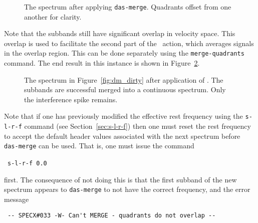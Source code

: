 \begin{figure}[ht]
\begin{minipage}[t]{\textwidth}
\begin{minipage}[b]{0.5\textwidth}
\leavevmode
\centering
\epsfxsize=3.0in
\end{minipage}
\hfill
\begin{minipage}[b]{0.45\textwidth}
\caption[After {\tt das-merge}]
{\small{The spectrum after applying {\tt das-merge}. Quadrants offset
from one another for clarity.
\vspace*{2cm}
}}
\label{fig:after-das-merge}
\end{minipage}
\end{minipage}
\end{figure}

Note that the subbands still have significant overlap in velocity
space. This overlap is used to facilitate the second part of the \dm\
action, which averages signals in the overlap region. This can be done
separately using the {\tt merge-quadrants} command. The end result in this
instance is shown in Figure~\ref{fig:dm_dasmerge}.
%
\begin{figure}[htb]
\centering
\leavevmode
\epsfxsize=4.0in
\vspace*{-0.5cm}
\begin{center}
\begin{minipage}[t]{5in}
\caption[Spectrum after \dm ]
{\small{The spectrum in Figure~\ref{fig:dm_dirty} after application of
\dm .  The subbands are successful merged into a continuous
spectrum. Only the interference spike remains.}}
\label{fig:dm_dasmerge}
\end{minipage}
\end{center}
\end{figure}

Note that if one has previously modified the effective rest frequency
using the {\tt s-l-r-f} command (see Section~\ref{sec:s-l-r-f}) then one
must reset the rest frequency
to accept the default header values associated with the next spectrum
before {\tt das-merge} can be used. That is, one must issue the
command

\SP\ {\tt s-l-r-f 0.0}

first. The consequence of not doing this is that the first subband
of the new spectrum appears to {\tt das-merge} to not have the correct
frequency, and the error message 

\verb| -- SPECX#033 -W- Can't MERGE - quadrants do not overlap --|


